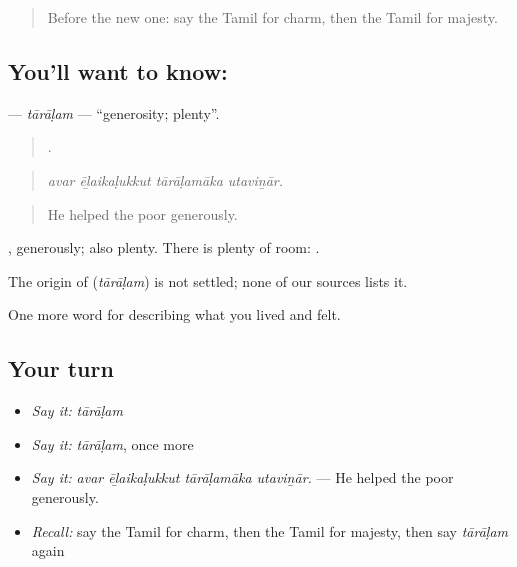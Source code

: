 \label{lesson:TA-C473-taralam}



\begin{quote}
Before the new one: say the Tamil for charm, then the Tamil for majesty.
\end{quote}

\subsection*{You'll want to know: }
\textbf{} — \emph{tārāḷam} — \textquotedblleft{}generosity; plenty\textquotedblright{}.

\begin{quote}
   .
\end{quote}

\begin{quote}
\emph{avar ēḻaikaḷukkut tārāḷamāka utaviṉār.}
\end{quote}

\begin{quote}
He helped the poor generously.
\end{quote}

, generously; also plenty. There is plenty of room:   .

\begin{cousinweb}
The origin of \textbf{} (\emph{tārāḷam}) is not settled; none of our sources lists it.
\end{cousinweb}

\begin{grammarlens}[title={What you've built}]
One more word for describing what you lived and felt.
\end{grammarlens}

\subsection*{Your turn}
\begin{itemize}
\raggedright
  \item \emph{Say it:} \emph{tārāḷam}
  \item \emph{Say it:} \emph{tārāḷam}, once more
  \item \emph{Say it:} \emph{avar ēḻaikaḷukkut tārāḷamāka utaviṉār.} — He helped the poor generously.
  \item \emph{Recall:} say the Tamil for charm, then the Tamil for majesty, then say \emph{tārāḷam} again
\end{itemize}


